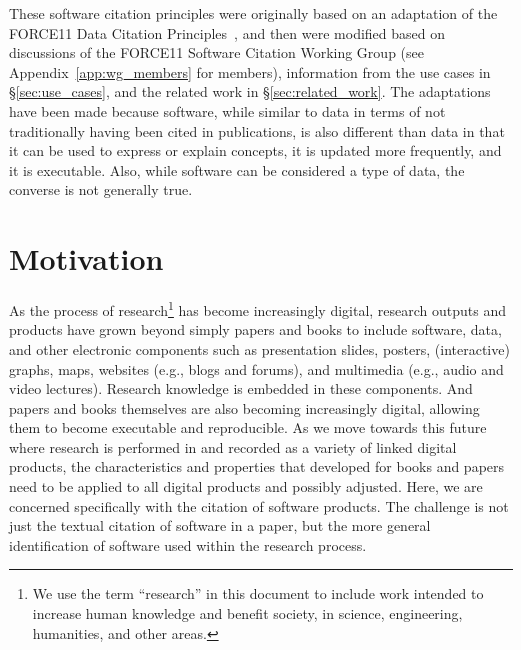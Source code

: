 \documentclass[11pt, oneside]{amsart}
\newcommand{\katznote}[1]{ {\textcolor{blue} { ***DSK: #1 }}} %
\begin{document}
These software citation principles were originally based on an adaptation of the
FORCE11 Data Citation Principles~\cite{data-citation-principles}, and then were
modified based on discussions of the FORCE11 Software Citation Working
Group (see Appendix~\ref{app:wg_members} for members), information from the use
cases in \S\ref{sec:use_cases}, and the related work in \S\ref{sec:related_work}.
The adaptations have been made
because software, while similar to data in terms of not traditionally having
been cited in publications, is also different than data in that it can be used
to express or explain concepts, it is updated more frequently, and it is
executable.
Also, while software can be considered a type of data, the converse is not
generally true.




\section{Motivation}
\label{sec:intro}

As the process of research\footnote{We use the term ``research'' in this document to include work intended to increase human knowledge and benefit society, in science, engineering, humanities, and other areas.} has become increasingly digital, research outputs
and products have grown beyond simply papers and books to include software,
data, and other electronic components such as presentation slides, posters,
(interactive)  graphs, maps, websites (e.g., blogs and forums), and multimedia
(e.g., audio and  video lectures).  Research knowledge is embedded in these
components. And papers and books themselves are also becoming increasingly
digital, allowing them to become executable and reproducible. As we move towards
this future where research is performed in and recorded as a variety of linked
digital products, the characteristics and properties that developed for books
and papers need to be applied to all digital products and possibly adjusted.
Here, we are concerned specifically with the citation of software products. The
challenge is not just the textual citation of software in a paper, but the more
general identification of software used within the research process.
\end{document}
